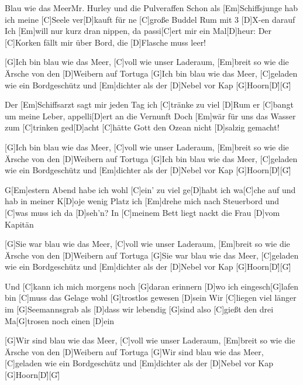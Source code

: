 \documentclass[../main.tex]{subfiles}
\begin{document}
\begin{song}[5]{Blau wie das Meer}{Mr. Hurley und die Pulveraffen}{}
Schon als [Em]Schiffsjunge hab ich meine [C]Seele ver[D]kauft
für ne [C]große Buddel Rum mit 3 [D]X-en darauf
Ich [Em]will nur kurz dran nippen, da passi[C]ert mir ein Mal[D]heur:
Der [C]Korken fällt mir über Bord, die [D]Flasche muss leer!

[G]Ich bin blau wie das Meer, [C]voll wie unser Laderaum,
[Em]breit so wie die Ärsche von den [D]Weibern auf Tortuga
[G]Ich bin blau wie das Meer,
[C]geladen wie ein Bordgeschütz und [Em]dichter als der [D]Nebel vor Kap [G]Hoorn[D]{\h}[G]{\h}

Der [Em]Schiffsarzt sagt mir jeden Tag ich [C]tränke zu viel [D]Rum
er [C]bangt um meine Leber, appelli[D]ert an die Vernunft
Doch [Em]wär für uns das Wasser zum [C]trinken ged[D]acht
[C]hätte Gott den Ozean nicht [D]salzig gemacht!

[G]Ich bin blau wie das Meer, [C]voll wie unser Laderaum,
[Em]breit so wie die Ärsche von den [D]Weibern auf Tortuga
[G]Ich bin blau wie das Meer,
[C]geladen wie ein Bordgeschütz und [Em]dichter als der [D]Nebel vor Kap [G]Hoorn[D]{\h}[G]{\h}

G[Em]estern Abend habe ich wohl [C]ein' zu viel ge[D]habt
ich wa[C]che auf und hab in meiner K[D]oje wenig Platz
ich [Em]drehe mich nach Steuerbord und [C]was muss ich da [D]seh'n?
In [C]meinem Bett liegt nackt die Frau [D]vom Kapitän

[G]Sie war blau wie das Meer, [C]voll wie unser Laderaum,
[Em]breit so wie die Ärsche von den [D]Weibern auf Tortuga
[G]Sie war blau wie das Meer,
[C]geladen wie ein Bordgeschütz und [Em]dichter als der [D]Nebel vor Kap [G]Hoorn[D]{\h}[G]{\h}

Und [C]kann ich mich morgens noch [G]daran erinnern [D]wo ich eingesch[G]lafen bin
[C]muss das Gelage wohl [G]trostlos gewesen [D]sein
Wir [C]liegen viel länger im [G]Seemannsgrab als [D]dass wir lebendig [G]sind
also [C]gießt den drei Ma[G]trosen noch einen [D]ein

[G]Wir sind blau wie das Meer, [C]voll wie unser Laderaum,
[Em]breit so wie die Ärsche von den [D]Weibern auf Tortuga
[G]Wir sind blau wie das Meer,
[C]geladen wie ein Bordgeschütz und [Em]dichter als der [D]Nebel vor Kap [G]Hoorn[D]{\h}[G]{\h}

\end{song}
\end{document}
